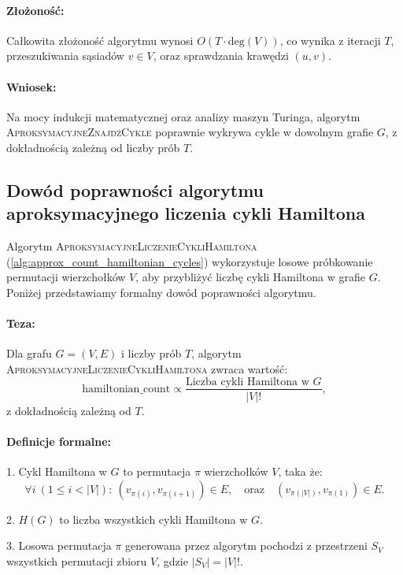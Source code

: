 \paragraph{Złożoność:}
Całkowita złożoność algorytmu wynosi \( O(T \cdot \text{deg}(V)) \), co wynika z iteracji \( T \), przeszukiwania sąsiadów \( v \in V \), oraz sprawdzania krawędzi \( (u, v) \).

\paragraph{Wniosek:}
Na mocy indukcji matematycznej oraz analizy maszyn Turinga, algorytm \textsc{AproksymacyjneZnajdźCykle} poprawnie wykrywa cykle w dowolnym grafie \( G \), z dokładnością zależną od liczby prób \( T \).


\subsection{Dowód poprawności algorytmu aproksymacyjnego liczenia cykli Hamiltona}

Algorytm \textsc{AproksymacyjneLiczenieCykliHamiltona} (\ref{alg:approx_count_hamiltonian_cycles}) wykorzystuje losowe próbkowanie permutacji wierzchołków \( V \), aby przybliżyć liczbę cykli Hamiltona w grafie \( G \). Poniżej przedstawiamy formalny dowód poprawności algorytmu.

\paragraph{Teza:}
Dla grafu \( G = (V, E) \) i liczby prób \( T \), algorytm \textsc{AproksymacyjneLiczenieCykliHamiltona} zwraca wartość:
\[
\text{hamiltonian\_count} \propto \frac{\text{Liczba cykli Hamiltona w } G}{|V|!},
\]
z dokładnością zależną od \( T \).

\paragraph{Definicje formalne:}
1. Cykl Hamiltona w \( G \) to permutacja \( \pi \) wierzchołków \( V \), taka że:
\[
\forall i \ (1 \leq i < |V|): \ (v_{\pi(i)}, v_{\pi(i+1)}) \in E, \quad \text{oraz} \quad (v_{\pi(|V|)}, v_{\pi(1)}) \in E.
\]

2. \( H(G) \) to liczba wszystkich cykli Hamiltona w \( G \).

3. Losowa permutacja \( \pi \) generowana przez algorytm pochodzi z przestrzeni \( S_V \) wszystkich permutacji zbioru \( V \), gdzie \( |S_V| = |V|! \).

